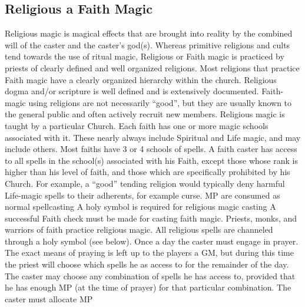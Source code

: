 \documentclass[twoside]{book}
\begin{document}
\subsection{Religious a Faith Magic}
      Religious magic is magical effects that are brought
               into reality by the combined will of the caster and the
               caster’s god(s). Whereas primitive religions and
               cults tend towards the use of ritual magic, Religious or
               Faith magic is practiced by priests of clearly defined and
               well organized religions. Most religions that practice
               Faith magic have a clearly organized hierarchy within the
               church. Religious dogma and/or scripture is well defined
               and is extensively documented. Faith-magic using religions
               are not necessarily “good”, but they are
               usually known to the general public and often actively
               recruit new members.   Religious magic is taught by a particular Church.
               Each faith has one or more magic schools associated with
               it. These nearly always include Spiritual and Life magic,
               and may include others. Most faiths have 3 or 4 schools of
               spells. A faith caster has access to all spells in the
               school(s) associated with his Faith, except those whose
               rank is higher than his level of faith, and those which
               are specifically prohibited by his Church. For example, a
               “good” tending religion would typically deny
               harmful Life-magic spells to their adherents, for example
               curse.   
                MP are consumed as normal spellcasting   
                  A holy symbol is required for religious magic
                 casting 
                  A successful Faith check must be made for casting
                 faith magic. 
              Priests, monks, and warriors of faith practice
               religious magic. All religious spells are channeled
               through a holy symbol (see below).   Once a day the caster must engage in prayer. The
               exact means of praying is left up to the players a GM,
               but during this time the priest will choose which spells
               he as access to for the remainder of the day. The caster
               may choose any combination of spells he has access to,
               provided that he has enough MP (at the time of prayer) for
               that particular combination. The caster must allocate MP
\end{document}
